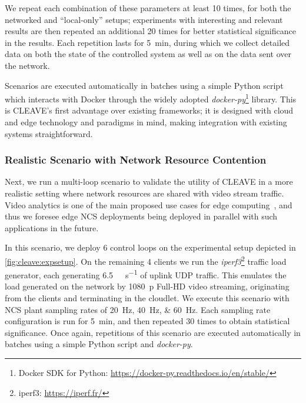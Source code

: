 We repeat each combination of these parameters at least \num{10} times, for both the networked and ``local-only'' setups; experiments with interesting and relevant results are then repeated an additional \num{20} times for better statistical significance in the results.
Each repetition lasts for \SI{5}{\minute}, during which we collect detailed data on both the state of the controlled system as well as on the data sent over the network.

Scenarios are executed automatically in batches using a simple Python script which interacts with Docker through the widely adopted \emph{docker-py}\footnote{Docker SDK for Python: \url{https://docker-py.readthedocs.io/en/stable/}} library.
This is \ac{CLEAVE}'s first advantage over existing frameworks; it is designed with cloud and edge technology and paradigms in mind, making integration with existing systems straightforward.

\subsubsection{Realistic Scenario with Network Resource Contention}

Next, we run a multi-loop scenario to validate the utility of \ac{CLEAVE} in a more realistic setting where network resources are shared with video stream traffic.
Video analytics is one of the main proposed use cases for edge computing~\cite{Ananthanarayanan2017Analytics,Yi2017Analytics,Wang2018Analytics}, and thus we foresee edge \ac{NCS} deployments being deployed in parallel with such applications in the future.

In this scenario, we deploy \num{6} control loops on the experimental setup depicted in \cref{fig:cleave:expsetup}.
On the remaining \num{4} clients we run the \emph{iperf3}\footnote{iperf3: \url{https://iperf.fr/}} traffic load generator, each generating \SI[per-mode=symbol]{6.5}{\mega\bit\per\second} of uplink \ac{UDP} traffic.
This emulates the load generated on the network by \SI{1080}{p} Full-HD video streaming, originating from the clients and terminating in the cloudlet.
We execute this scenario with \ac{NCS} plant sampling rates of \SIlist{20;40;60}{\hertz}.
Each sampling rate configuration is run for \SI{5}{\minute}, and then repeated \num{30} times to obtain statistical significance.
Once again, repetitions of this scenario are executed automatically in batches using a simple Python script and \emph{docker-py}.

